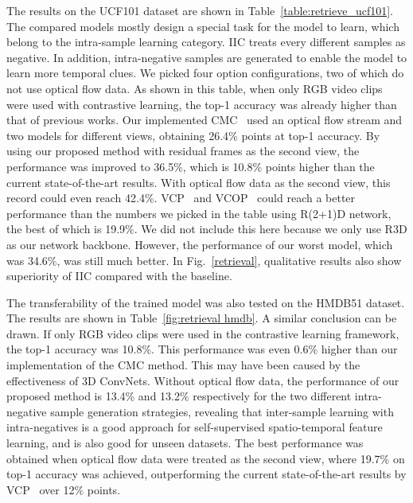 \documentclass[sigconf]{acmart}
\begin{document}
The results on the UCF101 dataset are shown in Table~\ref{table:retrieve_ucf101}. The compared models mostly design a special task for the model to learn, which belong to the intra-sample learning category. IIC treats every different samples as negative. In addition, intra-negative samples are generated to enable the model to learn more temporal clues. We picked four option configurations, two of which do not use optical flow data. As shown in this table, when only RGB video clips were used with contrastive learning, the top-1 accuracy was already higher than that of previous works. Our implemented CMC~\cite{tian2019contrastive} used an optical flow stream and two models for different views, obtaining 26.4\% points at top-1 accuracy. By using our proposed method with residual frames as the second view, the performance was improved to 36.5\%, which is 10.8\% points higher than the current state-of-the-art results. With optical flow data as the second view, this record could even reach 42.4\%. VCP~\cite{luo2020video} and VCOP~\cite{xu2019self} could reach a better performance than the numbers we picked in the table using R(2+1)D network, the best of which is 19.9\%. We did not include this here because we only use R3D as our network backbone. However, the performance of our worst model, which was 34.6\%, was still much better. In Fig.~\ref{retrieval}, qualitative results also show superiority of IIC compared with the baseline.

The transferability of the trained model was also tested on the HMDB51 dataset. The results are shown in Table~\ref{fig:retrieval hmdb}. A similar conclusion can be drawn. If only RGB video clips were used in the contrastive learning framework, the top-1 accuracy was 10.8\%. This performance was even 0.6\% higher than our implementation of the CMC method. This may have been caused by the effectiveness of 3D ConvNets. Without optical flow data, the performance of our proposed method is 13.4\% and 13.2\% respectively for the two different intra-negative sample generation strategies, revealing that inter-sample learning with intra-negatives is a good approach for self-supervised spatio-temporal feature learning, and is also good for unseen datasets. The best performance was obtained when optical flow data were treated as the second view, where 19.7\% on top-1 accuracy was achieved, outperforming the current state-of-the-art results by VCP~\cite{luo2020video} over 12\% points. 
\end{document}
